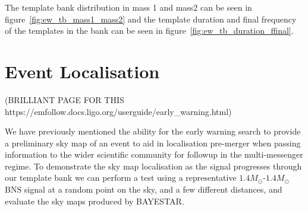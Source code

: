 %
The template bank distribution in mass 1 and mass2 can be seen in figure~\ref{fig:ew_tb_mass1_mass2} and the template duration and final frequency of the templates in the bank can be seen in figure~\ref{fig:ew_tb_duration_ffinal}.

\section{Event Localisation}

(BRILLIANT PAGE FOR THIS https://emfollow.docs.ligo.org/userguide/early\_warning.html)

We have previously mentioned the ability for the early warning search to provide a preliminary sky map of an event to aid in localisation pre-merger when passing information to the wider scientific community for followup in the multi-messenger regime. To demonstrate the sky map localisation as the signal progresses through our template bank we can perform a test using a representative $1.4M_\odot$-$1.4M_\odot$ BNS signal at a random point on the sky, and a few different distances, and evaluate the sky maps produced by BAYESTAR.

